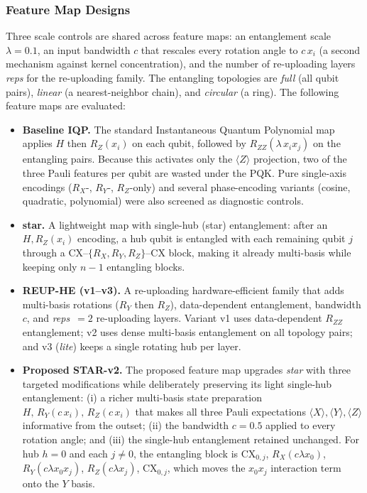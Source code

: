 \documentclass{ieeeaccess}
\begin{document}
\subsubsection{Feature Map Designs}
\label{subsubsec:featuremaps}
Three scale controls are shared across feature maps: an entanglement scale $\lambda=0.1$, an input bandwidth $c$ that rescales every rotation angle to $c\,x_i$ (a second mechanism against kernel concentration), and the number of re-uploading layers \textit{reps} for the re-uploading family. The entangling topologies are \textit{full} (all qubit pairs), \textit{linear} (a nearest-neighbor chain), and \textit{circular} (a ring). The following feature maps are evaluated:

\begin{itemize}
\item \textbf{Baseline IQP.} The standard Instantaneous Quantum Polynomial map applies $H$ then $R_Z(x_i)$ on each qubit, followed by $R_{ZZ}(\lambda\,x_i x_j)$ on the entangling pairs. Because this activates only the $\langle Z\rangle$ projection, two of the three Pauli features per qubit are wasted under the PQK. Pure single-axis encodings ($R_X$-, $R_Y$-, $R_Z$-only) and several phase-encoding variants (cosine, quadratic, polynomial) were also screened as diagnostic controls.
\item \textbf{star.} A lightweight map with single-hub (star) entanglement: after an $H,R_Z(x_i)$ encoding, a hub qubit is entangled with each remaining qubit $j$ through a $\text{CX}$--$\{R_X,R_Y,R_Z\}$--$\text{CX}$ block, making it already multi-basis while keeping only $n-1$ entangling blocks.
\item \textbf{REUP-HE (v1--v3).} A re-uploading hardware-efficient family that adds multi-basis rotations ($R_Y$ then $R_Z$), data-dependent entanglement, bandwidth $c$, and \textit{reps}~$=2$ re-uploading layers. Variant v1 uses data-dependent $R_{ZZ}$ entanglement; v2 uses dense multi-basis entanglement on all topology pairs; and v3 (\textit{lite}) keeps a single rotating hub per layer.
\item \textbf{Proposed STAR-v2.} The proposed feature map upgrades \textit{star} with three targeted modifications while deliberately preserving its light single-hub entanglement: (i) a richer multi-basis state preparation $H,\,R_Y(c\,x_i),\,R_Z(c\,x_i)$ that makes all three Pauli expectations $\langle X\rangle,\langle Y\rangle,\langle Z\rangle$ informative from the outset; (ii) the bandwidth $c=0.5$ applied to every rotation angle; and (iii) the single-hub entanglement retained unchanged. For hub $h{=}0$ and each $j\neq 0$, the entangling block is $\text{CX}_{0,j}$, $R_X(c\lambda x_0)$, $R_Y(c\lambda x_0 x_j)$, $R_Z(c\lambda x_j)$, $\text{CX}_{0,j}$, which moves the $x_0 x_j$ interaction term onto the $Y$ basis.
\end{itemize}
\end{document}
